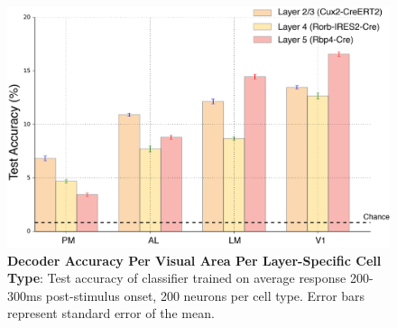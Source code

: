 \begin{figure}
  \centering
   \includegraphics[width=\textwidth]{Figures/chapter5/accuracy_cell_type_200_neurons.png}
  \caption[Image Identity Accuracy Per Visual Area Per Layer-Specific Cell Type]{\textbf{Decoder Accuracy Per Visual Area Per Layer-Specific Cell Type}: Test accuracy of classifier trained on average response 200-300ms post-stimulus onset, 200 neurons per cell type. Error bars represent standard error of the mean.}
   \label{fig:decodecell}
\end{figure}
